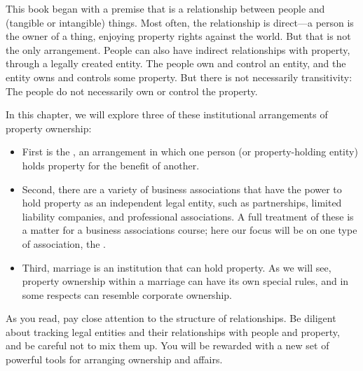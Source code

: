 This book began with a premise that  is a relationship between
people and (tangible or intangible) things. Most often, the relationship is
direct---a person is the owner of a thing, enjoying property rights against the
world. But that is not the only arrangement. People can also have indirect
relationships with property, through a legally created entity. The people own
and control an entity, and the entity owns and controls some property. But there
is not necessarily transitivity: The people do not necessarily own or control
the property.

In this chapter, we will explore three of these institutional arrangements of
property ownership:
\begin{itemize}
\item First is the , an arrangement in which one person (or
property-holding entity) holds property for the benefit of another.
\item Second, there are a variety of business associations that have the power
to hold property as an independent legal entity, such as partnerships, limited
liability companies, and professional associations. A full treatment of these is
a matter for a business associations course; here our focus will be on one type
of association, the .
\item Third, marriage is an institution that can hold property. As we will see,
property ownership within a marriage can have its own special rules, and in some
respects can resemble corporate ownership.
\end{itemize}
As you read, pay close attention to the structure of relationships. Be diligent
about tracking legal entities and their relationships with people and property,
and be careful not to mix them up. You will be rewarded with a new set of
powerful tools for arranging ownership and affairs.

